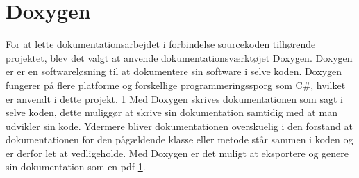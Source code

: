 \section{Doxygen}
For at lette dokumentationsarbejdet i forbindelse sourcekoden tilhørende projektet, blev det valgt at anvende dokumentationsværktøjet Doxygen. Doxygen er er en softwareløsning til at dokumentere sin software i selve koden. Doxygen fungerer på flere platforme og forskellige programmeringssporg som C\#, hvilket er anvendt i dette projekt. \ref{} Med Doxygen skrives dokumentationen som sagt i selve koden, dette muliggør at skrive sin dokumentation samtidig med at man udvikler sin kode. Ydermere bliver dokumentationen overskuelig i den forstand at dokumentationen for den pågældende klasse eller metode står sammen i koden og er derfor let at vedligeholde. Med Doxygen er det muligt at eksportere og genere sin dokumentation som en pdf \ref{}.